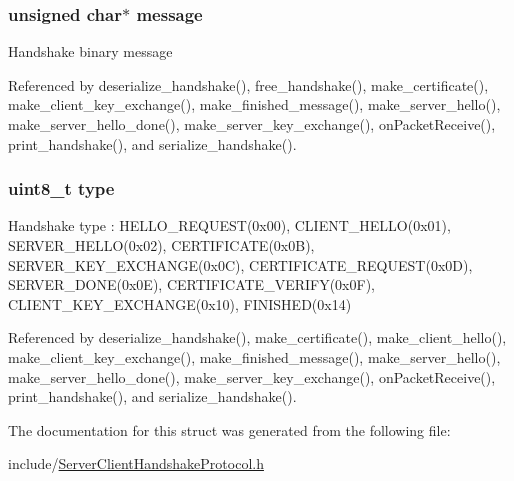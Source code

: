 \subsubsection[{\texorpdfstring{message}{message}}]{\setlength{\rightskip}{0pt plus 5cm}unsigned char$\ast$ message}\hypertarget{structhandshake__t_abb13456032cf48eaa794391b6ed937c7}{}\label{structhandshake__t_abb13456032cf48eaa794391b6ed937c7}
Handshake binary message 

Referenced by deserialize\+\_\+handshake(), free\+\_\+handshake(), make\+\_\+certificate(), make\+\_\+client\+\_\+key\+\_\+exchange(), make\+\_\+finished\+\_\+message(), make\+\_\+server\+\_\+hello(), make\+\_\+server\+\_\+hello\+\_\+done(), make\+\_\+server\+\_\+key\+\_\+exchange(), on\+Packet\+Receive(), print\+\_\+handshake(), and serialize\+\_\+handshake().

\subsubsection[{\texorpdfstring{type}{type}}]{\setlength{\rightskip}{0pt plus 5cm}uint8\+\_\+t type}\hypertarget{structhandshake__t_a1d127017fb298b889f4ba24752d08b8e}{}\label{structhandshake__t_a1d127017fb298b889f4ba24752d08b8e}
Handshake type \+: H\+E\+L\+L\+O\+\_\+\+R\+E\+Q\+U\+E\+S\+T(0x00), C\+L\+I\+E\+N\+T\+\_\+\+H\+E\+L\+L\+O(0x01), S\+E\+R\+V\+E\+R\+\_\+\+H\+E\+L\+L\+O(0x02), C\+E\+R\+T\+I\+F\+I\+C\+A\+T\+E(0x0\+B), S\+E\+R\+V\+E\+R\+\_\+\+K\+E\+Y\+\_\+\+E\+X\+C\+H\+A\+N\+G\+E(0x0\+C), C\+E\+R\+T\+I\+F\+I\+C\+A\+T\+E\+\_\+\+R\+E\+Q\+U\+E\+S\+T(0x0\+D), S\+E\+R\+V\+E\+R\+\_\+\+D\+O\+N\+E(0x0\+E), C\+E\+R\+T\+I\+F\+I\+C\+A\+T\+E\+\_\+\+V\+E\+R\+I\+F\+Y(0x0\+F), C\+L\+I\+E\+N\+T\+\_\+\+K\+E\+Y\+\_\+\+E\+X\+C\+H\+A\+N\+G\+E(0x10), F\+I\+N\+I\+S\+H\+E\+D(0x14) 

Referenced by deserialize\+\_\+handshake(), make\+\_\+certificate(), make\+\_\+client\+\_\+hello(), make\+\_\+client\+\_\+key\+\_\+exchange(), make\+\_\+finished\+\_\+message(), make\+\_\+server\+\_\+hello(), make\+\_\+server\+\_\+hello\+\_\+done(), make\+\_\+server\+\_\+key\+\_\+exchange(), on\+Packet\+Receive(), print\+\_\+handshake(), and serialize\+\_\+handshake().



The documentation for this struct was generated from the following file\+:\begin{DoxyCompactItemize}
\item 
include/\hyperlink{_server_client_handshake_protocol_8h}{Server\+Client\+Handshake\+Protocol.\+h}\end{DoxyCompactItemize}
